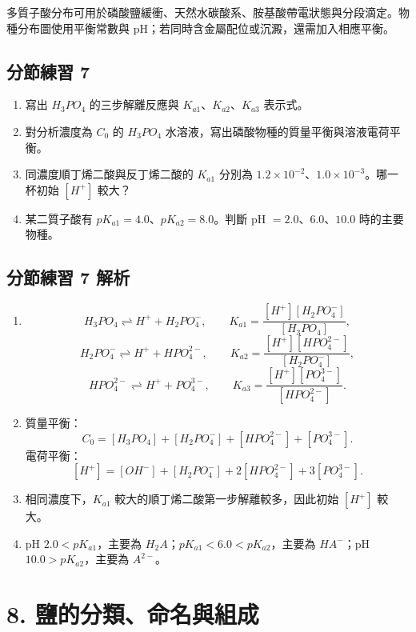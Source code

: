 \documentclass[11pt,a4paper]{article}
\providecommand{\tightlist}{%
  \setlength{\itemsep}{0pt}\setlength{\parskip}{0pt}}
\begin{document}
多質子酸分布可用於磷酸鹽緩衝、天然水碳酸系、胺基酸帶電狀態與分段滴定。物種分布圖使用平衡常數與 pH；若同時含金屬配位或沉澱，還需加入相應平衡。

\subsection{分節練習 7}\label{ux5206ux7bc0ux7df4ux7fd2-7}

\begin{enumerate}
\def\labelenumi{\arabic{enumi}.}
\tightlist
\item
  寫出 \(H_3PO_4\) 的三步解離反應與 \(K_{a1}\)、\(K_{a2}\)、\(K_{a3}\) 表示式。
\item
  對分析濃度為 \(C_0\) 的 \(H_3PO_4\) 水溶液，寫出磷酸物種的質量平衡與溶液電荷平衡。
\item
  同濃度順丁烯二酸與反丁烯二酸的 \(K_{a1}\) 分別為 \(1.2\times10^{-2}\)、\(1.0\times10^{-3}\)。哪一杯初始 \([H^+]\) 較大？
\item
  某二質子酸有 \(pK_{a1}=4.0\)、\(pK_{a2}=8.0\)。判斷 pH \(=2.0\)、\(6.0\)、\(10.0\) 時的主要物種。
\end{enumerate}

\subsection{分節練習 7 解析}\label{ux5206ux7bc0ux7df4ux7fd2-7-ux89e3ux6790}

\begin{enumerate}
\def\labelenumi{\arabic{enumi}.}
\tightlist
\item
  \[
   H_3PO_4\rightleftharpoons H^++H_2PO_4^-,
   \qquad
   K_{a1}=\frac{[H^+][H_2PO_4^-]}{[H_3PO_4]},
   \]
  \[
   H_2PO_4^-\rightleftharpoons H^++HPO_4^{2-},
   \qquad
   K_{a2}=\frac{[H^+][HPO_4^{2-}]}{[H_2PO_4^-]},
   \]
  \[
   HPO_4^{2-}\rightleftharpoons H^++PO_4^{3-},
   \qquad
   K_{a3}=\frac{[H^+][PO_4^{3-}]}{[HPO_4^{2-}]}.
   \]
\item
  質量平衡：
  \[
   C_0=[H_3PO_4]+[H_2PO_4^-]+[HPO_4^{2-}]+[PO_4^{3-}].
   \]
  電荷平衡：
  \[
   [H^+]=[OH^-]+[H_2PO_4^-]+2[HPO_4^{2-}]+3[PO_4^{3-}].
   \]
\item
  相同濃度下，\(K_{a1}\) 較大的順丁烯二酸第一步解離較多，因此初始 \([H^+]\) 較大。
\item
  pH \(2.0<pK_{a1}\)，主要為 \(H_2A\)；\(pK_{a1}<6.0<pK_{a2}\)，主要為 \(HA^-\)；pH \(10.0>pK_{a2}\)，主要為 \(A^{2-}\)。
\end{enumerate}

\section{8. 鹽的分類、命名與組成}\label{ux9e7dux7684ux5206ux985eux547dux540dux8207ux7d44ux6210}
\end{document}

